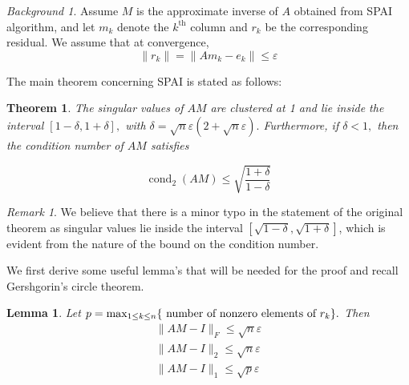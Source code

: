 \documentclass[paper=A4, fontsize=11pt]{scrartcl}
\let\originalleft\left
\let\originalright\right
\renewcommand{\left}{\mathopen{}\mathclose\bgroup\originalleft}
\renewcommand{\right}{\aftergroup\egroup\originalright}
\newtheorem{lemma}{Lemma}[section]
\newtheorem{theorem}{Theorem}[section]
\theoremstyle{remark}
\newtheorem*{rem}{Remark}
\newtheorem*{bgd}{Background}
\begin{document}
\begin{bgd} Assume $M$ is the approximate inverse of $A$ obtained from SPAI algorithm, and let $m_k$ denote the $k^{\text{th}}$ column and $r_k$ be the corresponding residual. We assume that at convergence, 
\begin{equation}\label{eq:conv}
\| r_k\| = \|A m_k- e_k\| \leq  \varepsilon 
\end{equation}
\end{bgd}
The main theorem concerning SPAI is stated as follows: 
\begin{theorem}
The singular values of \(A M\) are clustered at 1 and lie inside the
interval \([1-\delta, 1+\delta],\) with \(\delta=\sqrt{n} \varepsilon(2+\sqrt{n} \varepsilon) .\) Furthermore, if \(\delta<1,\) then the
condition number of \(A M\) satisfies

\begin{equation}
\operatorname{cond}_{2}(A M) \leq \sqrt{\frac{1+\delta}{1-\delta}}
\end{equation}


\end{theorem}

\begin{rem}
We believe that there is a minor typo in the statement of the original theorem as singular values lie inside the interval  \([\sqrt{1-\delta}, \sqrt{1+\delta}]\), which is evident from the nature of the bound on the condition number. 
\end{rem}

We first derive some useful lemma's that will be needed for the proof and recall Gershgorin's circle theorem. 

\begin{lemma}\label{lma:norms}
Let \(p=\max _{1 \leq k \leq n}\left\{\text { number of nonzero elements of } r_{k}\right\} .\) Then
\begin{align}
\|A M-I\|_{F} \leq \sqrt{n} \varepsilon \label{lem1a} \\
\|A M-I\|_{2} \leq \sqrt{n} \varepsilon \label{lem1b} \\
\|A M-I\|_{1}  \leq \sqrt{p} \varepsilon \label{lem1c}
\end{align}
\end{lemma}
\end{document}
